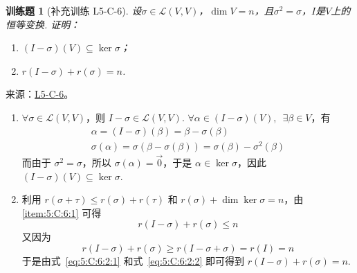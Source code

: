 \documentclass[12pt,fontset=fandol]{ctexart}
\newtheorem{exercise}{训练题}[section]
\begin{document}
\begin{exercise}[补充训练 L5-C-6]\label{prob:L5-C-6}
设$\sigma\in \mathcal{L}(V,V)$，$\dim V=n$，且$\sigma^2=\sigma$，$I$是$V$上的恒等变换. 证明：
        \begin{enumerate}
            \item $(I-\sigma)(V) \subseteq \ker\sigma$；

            \item $r(I-\sigma)+r(\sigma)=n$.
        \end{enumerate}
\end{exercise}
\noindent 来源：\href{https://github.com/yhwu-is/Linear-Algebra-Left-Undone/blob/new/%E8%AE%B2%E4%B9%89/%E4%B8%93%E9%A2%98/5%20%E7%BA%BF%E6%80%A7%E6%98%A0%E5%B0%84.tex}{L5-C-6}。
\begin{solve}
\begin{enumerate}
                \item \label{item:5:C:6:1}
                      $ \forall \sigma \in \mathcal{L}(V, V) $，则 $ I - \sigma \in \mathcal{L}(V, V) $. $ \forall \alpha \in (I - \sigma)(V),\enspace \exists \beta \in V $，有
                      \begin{gather*}
                          \alpha = (I - \sigma)(\beta) = \beta - \sigma(\beta) \\
                          \sigma(\alpha) = \sigma(\beta - \sigma(\beta)) = \sigma(\beta) - \sigma^2(\beta)
                      \end{gather*}
                      而由于 $ \sigma^2 = \sigma $，所以 $ \sigma(\alpha) = \vec{0} $，于是 $ \alpha \in \ker \sigma $，因此 $ (I - \sigma)(V) \subseteq \ker \sigma $.

                \item 利用 $ r(\sigma + \tau) \leqslant r(\sigma) + r(\tau) $ 和 $ r(\sigma) + \dim \ker \sigma = n $，由 \eqref{item:5:C:6:1} 可得
                      \begin{equation} \label{eq:5:C:6:2:1}
                          r(I - \sigma) + r(\sigma) \leqslant n
                      \end{equation}
                      又因为
                      \begin{equation} \label{eq:5:C:6:2:2}
                          r(I - \sigma) + r(\sigma) \geqslant r(I - \sigma + \sigma) = r(I) = n
                      \end{equation}
                      于是由式~\eqref{eq:5:C:6:2:1} 和式~\eqref{eq:5:C:6:2:2} 即可得到 $ r(I - \sigma) + r(\sigma) = n $.
            \end{enumerate}
\end{solve}
\end{document}
